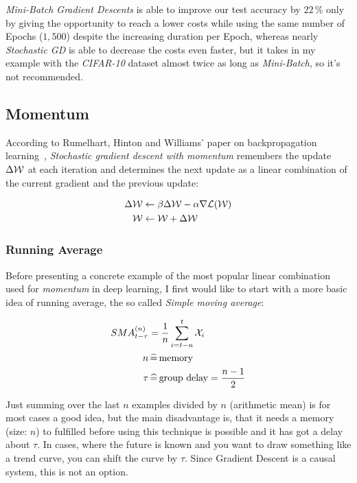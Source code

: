 \documentclass[dvipsnames,twocolumn]{scrartcl}
\begin{document}
	\emph{Mini-Batch Gradient Descents} is able to improve our test accuracy by $22$\,\% only by giving the opportunity to reach a lower costs while using the same number of Epochs ($1,500$) despite the increasing duration per Epoch, whereas nearly \emph{Stochastic GD} is able to decrease the costs even faster, but it takes in my example with the \emph{CIFAR-10} dataset almost twice as long as \emph{Mini-Batch}, so it's not recommended.
	
	
	\subsection{Momentum}
	
	According to Rumelhart, Hinton and Williams' paper on backpropagation learning~\cite{momentum}, \emph{Stochastic gradient descent with momentum} remembers the update $\Delta {\cal W}$ at each iteration and determines the next update as a linear combination of the current gradient and the previous update:
	
	\begin{align*}
	\Delta {\cal W} & \gets \beta \Delta {\cal W} - \alpha \nabla \cal{L}(W) \\
	{\cal W}        & \gets {\cal W} + \Delta {\cal W}
	\end{align*}
	
	\subsubsection{Running Average}
	
	Before presenting a concrete example of the most popular linear combination used for \emph{momentum} in deep learning, I first would like to start with a more basic idea of running average, the so called \emph{Simple moving average}:
	
	\begin{align*}
	SMA^{(n)}_{t-\tau} & = \frac{1}{n} \sum_{i=t-n}^{t}{\cal X}_{i}        \\
	n                  & \,\widehat{=}\,\text{memory}                      \\
	\tau               & \,\widehat{=}\,\text{group delay} = \frac{n-1}{2}
	\end{align*}
	
	Just summing over the last $n$ examples divided by $n$ (arithmetic mean) is for most cases a good idea, but the main disadvantage is, that it needs a memory (size: $n$) to fulfilled before using this technique is possible and it has got a delay about $\tau$. In cases, where the future is known and you want to draw something like a trend curve, you can shift the curve by $\tau$. Since Gradient Descent is a causal system, this is not an option.\\
	
\end{document}
